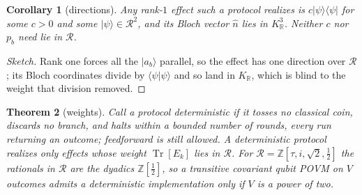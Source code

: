 \documentclass[11pt,a4paper]{article}
\DeclareMathOperator{\Tr}{Tr}
\newcommand{\R}{\mathbb{R}}
\newcommand{\phig}{\tau}      %
\newcommand{\ket}[1]{|#1\rangle}
\newcommand{\braket}[2]{\langle#1|#2\rangle}
\newcommand{\ketbra}[2]{|#1\rangle\langle#2|}
\newenvironment{sketch}{\renewcommand{\qedsymbol}{}\begin{proof}[Sketch]}{\end{proof}}
\newtheorem{theorem}{Theorem}
\newtheorem{corollary}[theorem]{Corollary}
\begin{document}
\begin{corollary}[directions] \label{cor:directions}
Any rank-$1$ effect such a protocol realizes is $c\ketbra{\psi}{\psi}$ for some $c > 0$ and some $\ket{\psi} \in \mathcal{R}^2$, and its Bloch vector $\hat n$ lies in $K_\R^3$. Neither $c$ nor $p_b$ need lie in $\mathcal{R}$.
\end{corollary}

\begin{sketch}
Rank one forces all the $\ket{a_b}$ parallel, so the effect has one direction over $\mathcal{R}$; its Bloch coordinates divide by $\braket{\psi}{\psi}$ and so land in $K_\R$, which is blind to the weight that division removed.
\end{sketch}

\begin{theorem}[weights] \label{thm:weight}
Call a protocol \textit{deterministic} if it tosses no classical coin, discards no branch, and halts within a bounded number of rounds, every run returning an outcome; feedforward is still allowed. A deterministic protocol realizes only effects whose \textit{weight} $\Tr[E_k]$ lies in $\mathcal{R}$. For $\mathcal{R} = \mathbb{Z}[\phig, i, \sqrt{2}, \tfrac{1}{2}]$ the rationals in $\mathcal{R}$ are the dyadics $\mathbb{Z}[\tfrac{1}{2}]$, so a transitive covariant qubit POVM on $V$ outcomes admits a deterministic implementation only if $V$ is a power of two.
\end{theorem}
\end{document}

